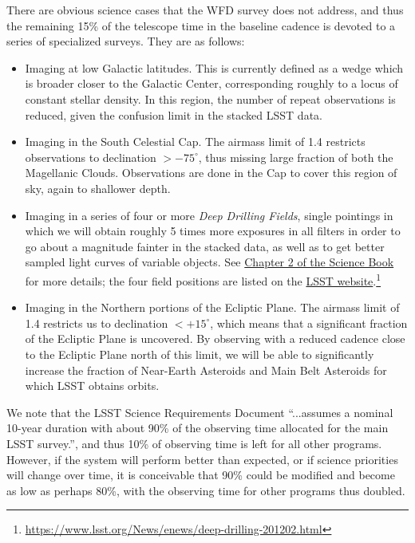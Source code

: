 There are obvious science cases that the WFD survey does
not address, and thus the remaining 15\% of the telescope time in the
baseline cadence is devoted to a series of specialized surveys.  They
are as follows:
\begin{itemize}
\item Imaging at low Galactic latitudes.  This is currently defined as
  a wedge which is broader closer to the Galactic Center,
  corresponding roughly to a locus of constant stellar density.  In
  this region, the number of repeat observations is reduced, given the
  confusion limit in the stacked LSST data.
\item Imaging in the South Celestial Cap.  The airmass limit of 1.4
  restricts observations to declination $> -75^\circ$, thus missing
  large fraction of both the Magellanic Clouds.
  Observations are done in the Cap to cover this region of sky, again
  to shallower depth.
\item Imaging in a series of four or more {\em Deep Drilling Fields},   single
  pointings in which
  we will obtain roughly 5 times more exposures in all
  filters in order to go about a magnitude fainter in the stacked
  data, as well as to get better sampled light curves of variable
  objects. See \href{https://www.lsst.org/sites/default/files/docs/sciencebook/SB_2.pdf}{Chapter 2 of the Science Book} \citep{2009arXiv0912.0201L} for more details; the four field positions are listed on the \href{https://www.lsst.org/News/enews/deep-drilling-201202.html}{LSST website}.\footnote{\url{https://www.lsst.org/News/enews/deep-drilling-201202.html}}
\item Imaging in the Northern portions of the Ecliptic Plane.  The
  airmass limit of 1.4 restricts us to declination $< +15^\circ$, which
  means that a significant fraction of the Ecliptic Plane
  is uncovered.  By observing with a reduced cadence close to the
  Ecliptic Plane north of this limit, we will be able to significantly
  increase the fraction of Near-Earth Asteroids and Main Belt
  Asteroids for which LSST obtains orbits.
\end{itemize}

We note that the LSST Science Requirements Document ``...assumes a nominal
10-year duration with about 90\% of the observing time allocated for the main
LSST survey.'', and thus 10\% of observing time is left for all other programs.
However, if the system will perform better than expected, or if science priorities
will change over time, it is conceivable that 90\% could be modified and become
as low as perhaps 80\%, with the observing time for other programs thus doubled.

